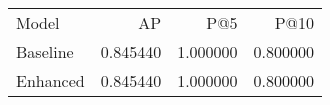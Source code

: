 \begin{tabular}{lrrr}
Model & AP & P@5 & P@10 \\
Baseline & 0.845440 & 1.000000 & 0.800000 \\
Enhanced & 0.845440 & 1.000000 & 0.800000 \\
\end{tabular}
